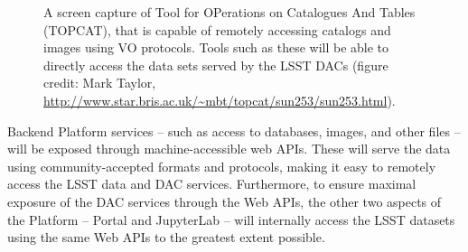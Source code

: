 \documentclass[DM,lsstdraft,toc]{lsstdoc}
\begin{document}
\begin{figure}
	\centering
	\caption{A screen capture of Tool for OPerations on Catalogues And Tables (TOPCAT), that is capable of remotely accessing catalogs and images using VO protocols. Tools such as these will be able to directly access the data sets served by the LSST DACs (figure credit: Mark Taylor, \url{http://www.star.bris.ac.uk/~mbt/topcat/sun253/sun253.html}).
		\label{fig:toolsTOPCAT}}
\end{figure}

Backend Platform services -- such as access to
databases, images, and other files -- will be exposed through
machine-accessible web APIs. These will serve the data using community-accepted
formats and protocols, making it easy to remotely access the LSST data and DAC
services. Furthermore, to ensure maximal exposure of the DAC services through
the Web APIs, the other two aspects of the Platform -- Portal and JupyterLab -- will 
internally access the LSST datasets using the same Web APIs to the greatest extent possible.
\end{document}
